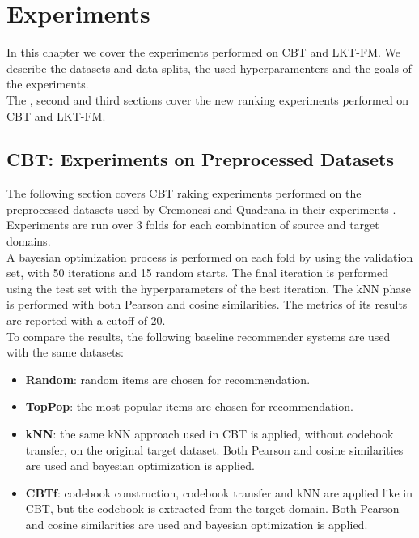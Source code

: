 \chapter{Experiments}
\label{ch:experiments}

In this chapter we cover the experiments performed on CBT and LKT-FM. We describe the datasets and data splits, the used hyperparamenters and the goals of the experiments.\\
The \cite{10.1145/2645710.2645769}, second and third sections cover the new ranking experiments performed on CBT and LKT-FM.



\section{CBT: Experiments on Preprocessed Datasets}

The following section covers CBT raking experiments performed on the preprocessed datasets used by Cremonesi and Quadrana in their experiments \cite{10.1145/2645710.2645769}.\\
Experiments are run over 3 folds for each combination of source and target domains.\\
A bayesian optimization process is performed on each fold by using the validation set, with 50 iterations and 15 random starts. The final iteration is performed using the test set with the hyperparameters of the best iteration. The kNN phase is performed with both Pearson and cosine similarities. The metrics of its results are reported with a cutoff of 20.\\
To compare the results, the following baseline recommender systems are used with the same datasets:
\begin{itemize}
\item \textbf{Random}: random items are chosen for recommendation.
\item \textbf{TopPop}: the most popular items are chosen for recommendation.
\item \textbf{kNN}: the same kNN approach used in CBT is applied, without codebook transfer, on the original target dataset. Both Pearson and cosine similarities are used and bayesian optimization is applied.
\item \textbf{CBTf}: codebook construction, codebook transfer and kNN are applied like in CBT, but the codebook is extracted from the target domain. Both Pearson and cosine similarities are used and bayesian optimization is applied.
\end{itemize}



